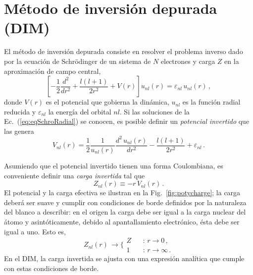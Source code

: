 \section{Método de inversión depurada (DIM)}
\label{sec:dimatomos}

El método de inversión depurada consiste en resolver el problema inverso
dado por la ecuación de Schr\"odinger de un sistema de $N$ electrones y 
carga $Z$ en la aproximación de campo central, 
\begin{equation}
 \left[ -\frac{1}{2}\frac{d^2}{dr^2} + \frac{l(l+1)}{2r^2} +
 V(r) \right] u_{nl}(r) = \varepsilon_{nl} \, u_{nl}(r)\,,
\label{eq:eqSchroRadial}
\end{equation}
donde $V(r)$ es el potencial que gobierna la dinámica, $u_{nl}$ es la 
función radial reducida y $\varepsilon_{nl}$ la energía del orbital 
$nl$. Si las soluciones de la Ec.~(\ref{eq:eqSchroRadial}) se conocen, 
es posible definir un \textit{potencial invertido} que las genera
\begin{equation}
V_{nl}(r) = 
\frac{1}{2}\frac{1}{u_{nl}(r)} \frac{d^2\,u_{nl}(r)}{dr^{2}} - 
\frac{l(l+1)}{2r^{2}}+\varepsilon_{nl} \,.
\label{eq:Vinv}
\end{equation}

Asumiendo que el potencial invertido tienen una forma Coulombiana, 
es conveniente definir una \textit{carga invertida} tal que
\begin{equation}
Z_{nl}(r) \equiv -r \, V_{nl}(r) \,.
\label{eq:Zinv}
\end{equation}
El potencial y la carga efectiva se ilustran en la 
Fig.~\ref{fig:potycharge}; la carga deberá ser suave y cumplir con 
condiciones de borde definidos por la naturaleza del blanco a describir: 
en el origen la carga debe ser igual a la carga nuclear del átomo y 
asintóticamente, debido al apantallamiento electrónico, ésta debe ser
igual a uno. Esto es,
\begin{equation}
Z_{nl}(r) \, \rightarrow 
\bigg\{ 
\begin{array}{ll}
Z  \ \  & \ \ \text{:\ \ }r  \rightarrow 0 \,, \\ 
1           & \ \ \text{:\ \ }r  \rightarrow \infty \,.
\end{array}
\label{eq:Zasympt}
\end{equation} 
En el DIM, la carga invertida se ajusta con una expresión analítica que 
cumple con estas condiciones de borde.

